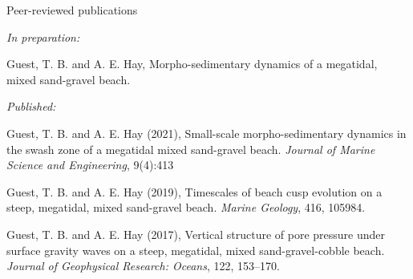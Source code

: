 \documentclass{resume} %
\begin{document}
\begin{rSection}{Peer-reviewed publications}
	
	{\em In preparation:}
	
	Guest, T. B. and A. E. Hay, Morpho-sedimentary dynamics of a megatidal, mixed sand-gravel beach.
	
	{\em Published:}
	
	Guest, T. B. and A. E. Hay (2021), Small-scale morpho-sedimentary dynamics in the swash zone of a megatidal mixed sand-gravel beach. \textit{Journal of Marine Science and Engineering}, 9(4):413
	
	Guest, T. B. and A. E. Hay (2019), Timescales of beach cusp evolution on a steep, megatidal, mixed sand-gravel beach. \textit{Marine Geology}, 416, 105984.
	
	Guest, T. B. and A. E. Hay (2017), Vertical structure of pore pressure under surface gravity waves on a steep, megatidal, mixed sand-gravel-cobble beach. \textit{Journal of Geophysical Research: Oceans}, 122, 153–170.
	
\end{rSection}
\end{document}
